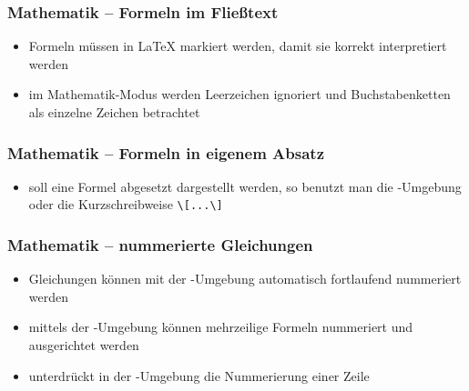 
\begin{frame}[fragile]
	\frametitle{Mathematik -- Formeln im Fließtext}
	\begin{itemize}
        \item Formeln müssen in \LaTeX{} markiert werden, damit sie korrekt interpretiert werden
		\item im Mathematik-Modus werden Leerzeichen ignoriert und Buchstabenketten als einzelne Zeichen betrachtet
	\end{itemize}
	\vfill
\end{frame}

\begin{frame}[fragile]
	\frametitle{Mathematik -- Formeln in eigenem Absatz}
	\begin{itemize}
		\item soll eine Formel abgesetzt dargestellt werden, so benutzt man die -Umgebung oder die Kurzschreibweise \lstinline$\[...\]$
	\end{itemize}
	\vfill
\end{frame}

\begin{frame}[fragile]
	\frametitle{Mathematik -- nummerierte Gleichungen}
	\begin{itemize}
		\item Gleichungen können mit der -Umgebung automatisch fortlaufend nummeriert werden
		\item mittels der -Umgebung können mehrzeilige Formeln nummeriert und ausgerichtet werden
		\item {} unterdrückt in der -Umgebung die Nummerierung einer Zeile
	\end{itemize}
	\vfill
\end{frame}

